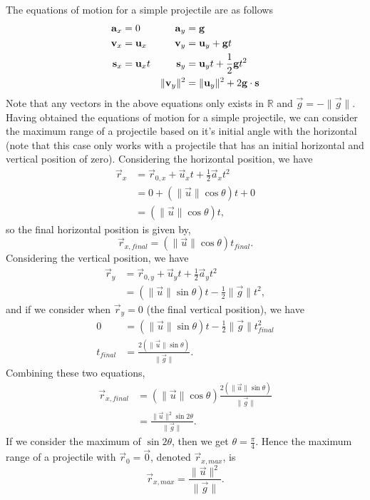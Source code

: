 The equations of motion for a simple projectile are as follows
\begin{align}
    \vec{a}_x &= 0 & \vec{a}_y &= \vec{g} \\
    \vec{v}_x &= \vec{u}_x & \vec{v}_y &= \vec{u}_y + \vec{g}t \\
    \vec{s}_x &= \vec{u}_x t & \vec{s}_y &= \vec{u}_y t + \frac{1}{2} \vec{g}t^2 \\
    \hspace{1mm} & \hspace{1mm} & \| \vec{v}_y \|^2 &= \| \vec{u}_y \|^2 + 2 \vec{g} \cdot \vec{s} 
\end{align}
Note that any vectors in the above equations only exists in $\mathbb{R}$ and $\vec{g} = - \| \vec{g} \|$. Having obtained the equations of motion for a simple projectile, we can consider the maximum range of a projectile based on it's initial angle with the horizontal (note that this case only works with a projectile that has an initial horizontal and vertical position of zero). Considering the horizontal position, we have
\begin{align*}
    \vec{r}_x &= \vec{r}_{0, x} + \vec{u}_x t + \frac{1}{2} \vec{a}_x t^2 \\
    &= 0 + (\| \vec{u} \| \cos \theta) t + 0 \\
    &= (\| \vec{u} \| \cos \theta) t,
\end{align*}
so the final horizontal position is given by, 
\begin{equation*}
    \vec{r}_{x, final} = (\| \vec{u} \| \cos \theta) t_{final}.
\end{equation*}
Considering the vertical position, we have
\begin{align*}
    \vec{r}_y &= \vec{r}_{0, y} + \vec{u}_y t + \frac{1}{2} \vec{a}_y t^2 \\
    &= (\| \vec{u} \| \sin \theta) t - \frac{1}{2} \| \vec{g} \| t^2,
\end{align*}
and if we consider when $\vec{r}_y = 0$ (the final vertical position), we have
\begin{align*}
    0 &= (\| \vec{u} \| \sin \theta) t - \frac{1}{2} \| \vec{g} \| t_{final}^2 \\
    t_{final} &= \frac{2(\| \vec{u} \| \sin \theta)}{\| \vec{g} \|}.
\end{align*}
Combining these two equations,
\begin{align}
    \vec{r}_{x, final} &= (\| \vec{u} \| \cos \theta) \frac{2(\| \vec{u} \| \sin \theta)}{\| \vec{g} \|} \\
    &= \frac{\| \vec{u} \|^2 \sin 2\theta}{\| \vec{g} \|}.
\end{align}
If we consider the maximum of $\sin 2\theta$, then we get $\theta = \frac{\pi}{4}$. Hence the maximum range of a projectile with $\vec{r}_0 = \vec{0}$, denoted $\vec{r}_{x, max}$, is 
\begin{equation}
    \vec{r}_{x, max} = \frac{\| \vec{u} \|^2}{\| \vec{g} \|}.
\end{equation}

